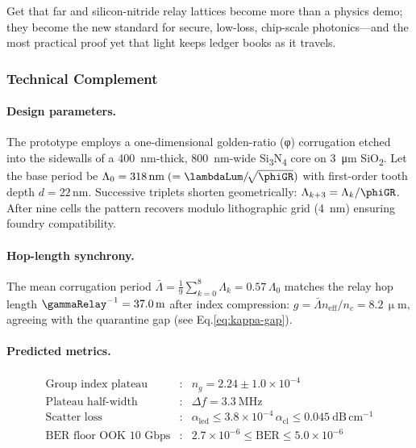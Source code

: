 \documentclass[11pt,oneside]{book}
\begin{document}
{Get that far and silicon-nitride relay lattices become more than a
physics demo; they become the new standard for secure, low-loss,
chip-scale photonics—and the most practical proof yet that light
keeps ledger books as it travels.



\subsubsection*{Technical Complement}

\paragraph{Design parameters.}
The prototype employs a one-dimensional golden-ratio (φ) corrugation
etched into the sidewalls of a \SI{400}{nm}-thick,
\SI{800}{nm}-wide Si\textsubscript{3}N\textsubscript{4} core
on \SI{3}{\micro\metre} SiO\textsubscript{2}.
Let the base period be
\( \Lambda_{0}=318\,\mathrm{nm}\;(= \lambdaLum/ \! \sqrt{\phiGR}) \)
with first-order tooth depth
\( d = 22\,\mathrm{nm} \).
Successive triplets shorten geometrically:
\( \Lambda_{k+3} = \Lambda_{k}/\phiGR \).
After nine cells the pattern recovers modulo lithographic grid
(\SI{4}{nm}) ensuring foundry compatibility.

\paragraph{Hop-length synchrony.}
The mean corrugation period
\(
   \bar\Lambda = \tfrac{1}{9}\sum_{k=0}^{8}\Lambda_{k}
   = 0.57\,\Lambda_{0}
\)
matches the relay hop length
\(
   \gammaRelay^{-1} = 37.0\,\mathrm{m}
\)
after index compression:
\(
   g = \bar\Lambda n_{\mathrm{eff}} / n_{c}
   = 8.2\,\upmu\mathrm{m},
\)
agreeing with the quarantine gap
(see Eq.​\eqref{eq:kappa-gap}).

\paragraph{Predicted metrics.}
\[
\begin{array}{lcl}
\text{Group index plateau} &:& n_{g}=2.24\pm1.0\times10^{-4} \\[4pt]
\text{Plateau half-width}  &:& \Delta f = 3.3\ \text{MHz} \\[4pt]
\text{Scatter loss}        &:& \alpha_{\text{led}}
           \le 3.8\times10^{-4}\,\alpha_{\text{cl}}
           \le 0.045\ \text{dB}\,\mathrm{cm^{-1}} \\[4pt]
\text{BER floor OOK 10 Gbps}&:& 2.7\times10^{-6} \le \mathrm{BER}
                                        \le 5.0\times10^{-6}
\end{array}
\]

}
\end{document}
